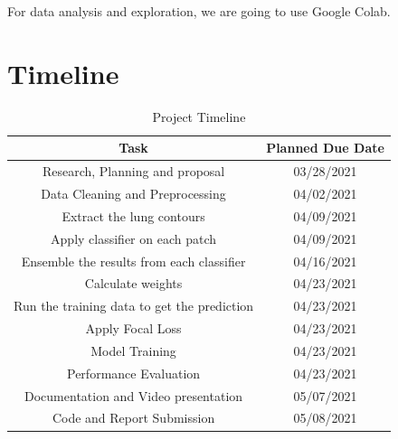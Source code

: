 \documentclass{sigkddExp}
\begin{document}
For data analysis and exploration, we are going to use Google Colab.


\section{Timeline}


\begin{table}[H]
    \centering
    \caption{Project Timeline}
    \begin{tabular}{|c|c|} \hline
        Task&Planned Due Date\\ \hline
        Research, Planning and proposal &03/28/2021\\ \hline
        Data Cleaning and Preprocessing & 04/02/2021\\ \hline
        Extract the lung contours & 04/09/2021\\ \hline
        Apply classifier on each patch & 04/09/2021\\ \hline
        Ensemble the results from each classifier & 04/16/2021\\ \hline
        Calculate weights & 04/23/2021 \\ \hline
        Run the training data to get the prediction & 04/23/2021 \\ \hline
        Apply Focal Loss & 04/23/2021 \\ \hline
        Model Training & 04/23/2021 \\ \hline
        Performance Evaluation & 04/23/2021 \\ \hline
        Documentation and Video presentation & 05/07/2021 \\ \hline
        Code and Report Submission & 05/08/2021 \\
        \hline\end{tabular}
    \end{table}
    
    
    
    
\end{document}
